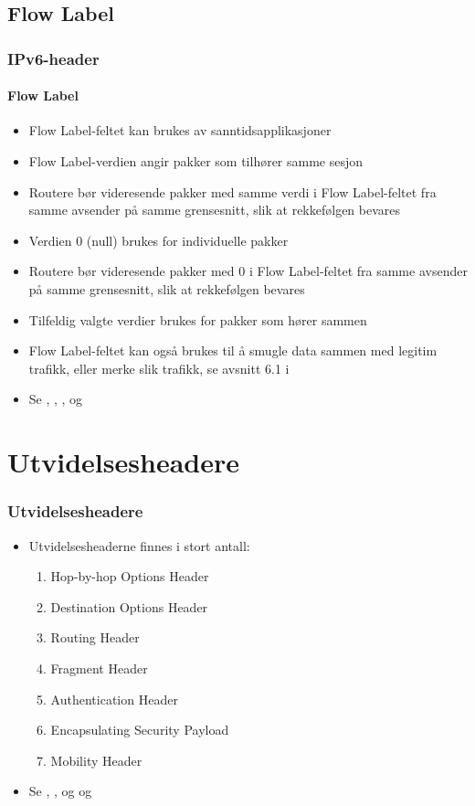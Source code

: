 \subsection{Flow Label}
\begin{frame}%
  \frametitle{IPv6-header}
  \framesubtitle{Flow Label}
  \begin{itemize}%
  \item Flow Label-feltet kan brukes av sanntidsapplikasjoner
  \item Flow Label-verdien angir pakker som tilhører samme sesjon
  \item Routere bør videresende pakker med samme verdi i Flow
    Label-feltet fra samme avsender på samme grensesnitt, slik at
    rekkefølgen bevares
  \item Verdien 0 (null) brukes for individuelle pakker
  \item Routere bør videresende pakker med 0 i Flow Label-feltet fra
    samme avsender på samme grensesnitt, slik at rekkefølgen bevares
  \item Tilfeldig valgte verdier brukes for pakker som hører sammen
  \item Flow Label-feltet kan også brukes til å smugle data sammen med
    legitim trafikk, eller merke slik trafikk, se avsnitt 6.1 i
  \item Se , , ,  og 
  \end{itemize}
\end{frame}

\section{Utvidelsesheadere}
\begin{frame}%
  \frametitle{Utvidelsesheadere}
  \begin{itemize}%
  \item Utvidelsesheaderne finnes i stort antall:
    \begin{enumerate}%
    \item Hop-by-hop Options Header
    \item Destination Options Header
    \item Routing Header
    \item Fragment Header
    \item Authentication Header
    \item Encapsulating Security Payload
    \item Mobility Header
    \end{enumerate}
  \item Se , ,  og  og
  \end{itemize}
\end{frame}

